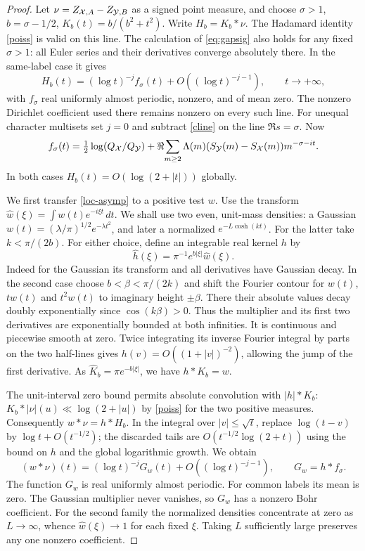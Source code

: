 \begin{proof}
Let $\nu=Z_{\mathcal X,A}-Z_{\mathcal Y,B}$ as a signed point measure, and choose
$\sigma>1$, $b=\sigma-1/2$, $K_b(t)=b/(b^2+t^2)$. Write $H_b=K_b*\nu$.
The Hadamard identity \eqref{poiss} is valid on this line.
The calculation of \eqref{eq:gapsig} also holds for any fixed $\sigma>1$:
all Euler series and their derivatives converge absolutely there. In the
same-label case it gives
\begin{equation}\label{loc-asymp}
 H_b(t)=(\log t)^{-j}f_\sigma(t)+O((\log t)^{-j-1}),\qquad t\to+\infty ,
\end{equation}
with $f_\sigma$ real uniformly almost periodic, nonzero, and of mean zero.
The nonzero Dirichlet coefficient used there remains nonzero on every such
line. For unequal character multisets set $j=0$ and subtract \eqref{cline}
on the line $\Re s=\sigma$. Now
\[
 f_\sigma(t)=\tfrac12\log(Q_{\mathcal X}/Q_{\mathcal Y})
 +\Re\!\sum_{m\ge2}\Lambda(m)(S_{\mathcal Y}(m)-S_{\mathcal X}(m))m^{-\sigma-it}.
\]
In both cases $H_b(t)=O(\log(2+|t|))$ globally.

We first transfer \eqref{loc-asymp} to a positive test $w$. Use the transform
$\widehat w(\xi)=\int w(t)e^{-i\xi t}\,dt$. We shall use two even,
unit-mass densities: a Gaussian $w(t)=(\lambda/\pi)^{1/2}e^{-\lambda t^2}$,
and later a normalized $e^{-L\cosh(kt)}$. For the latter take
$k<\pi/(2b)$. For either choice, define an integrable real kernel $h$ by
\[
 \widehat h(\xi)=\pi^{-1}e^{b|\xi|}\widehat w(\xi).
\]
Indeed for the Gaussian its transform and all derivatives have Gaussian decay.
In the second case choose $b<\beta<\pi/(2k)$ and shift the Fourier contour for
$w(t)$, $tw(t)$ and $t^2w(t)$ to imaginary height $\pm\beta$. There their
absolute values decay doubly exponentially since $\cos(k\beta)>0$.
Thus the multiplier and its first two derivatives are exponentially bounded
at both infinities. It is continuous and piecewise smooth at zero.
Twice integrating its inverse Fourier integral by parts on the two half-lines
gives $h(v)=O((1+|v|)^{-2})$, allowing the jump of the first derivative.
As $\widehat K_b=\pi e^{-b|\xi|}$, we have $h*K_b=w$.

The unit-interval zero bound permits absolute convolution with $|h|*K_b$:
$K_b*|\nu|(u)\ll\log(2+|u|)$ by \eqref{poiss} for the two positive measures.
Consequently $w*\nu=h*H_b$. In the integral over $|v|\le\sqrt{t}$, replace
$\log(t-v)$ by $\log t+O(t^{-1/2})$; the discarded tails are
$O(t^{-1/2}\log(2+t))$ using the bound on $h$ and the global logarithmic
growth. We obtain
\begin{equation}\label{loc-smoothed}
 (w*\nu)(t)=(\log t)^{-j}G_w(t)+O((\log t)^{-j-1}),\qquad
 G_w=h*f_\sigma .
\end{equation}
The function $G_w$ is real uniformly almost periodic. For common labels its
mean is zero. The Gaussian multiplier never vanishes, so $G_w$ has a nonzero
Bohr coefficient. For the second family the normalized densities concentrate
at zero as $L\to\infty$, whence $\widehat w(\xi)\to1$ for each fixed $\xi$.
Taking $L$ sufficiently large preserves any one nonzero coefficient.


\end{proof}
